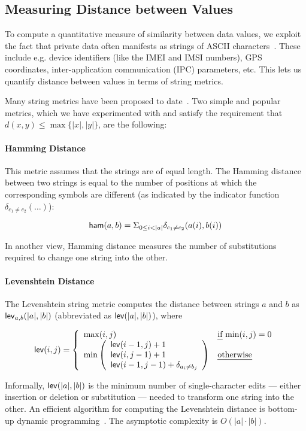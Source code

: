 \subsection{Measuring Distance between Values}\label{Se:similarstr}

To compute a quantitative measure of similarity between data values, we exploit the fact that private data often manifests as strings of ASCII characters~\cite{EGCCJMS:OSDI10,HHJSW:CCS11,YYZGNW:CCS13}. These include e.g. device identifiers (like the IMEI and IMSI numbers), GPS coordinates, inter-application communication (IPC) parameters, etc. This lets us quantify distance between values in terms of string metrics. 

Many string metrics have been proposed to date~\cite{PS:BIS07}. Two simple and popular metrics, which we have experimented with and satisfy the requirement that 
$d(x,y) \leq \max \{ |x|,|y| \}$, are the following:

\paragraph{Hamming Distance} This metric assumes that the strings are of equal length. The Hamming distance between two strings is equal to the number of positions at which the corresponding symbols are different (as indicated by the indicator function $\delta_{c_1 \neq c_2}(\ldots)$):
\begin{small}
$$
{\sf ham}(a,b) = \Sigma_{0 \leq i < |a|} \delta_{c_1 \neq c_2}(a(i),b(i))
$$
\end{small}
In another view, Hamming distance measures the number of substitutions required to change one string into the other.

\paragraph{Levenshtein Distance} The Levenshtein string metric computes the distance between strings $a$ and $b$ as ${\sf lev}_{a,b}(|a|,|b|)$ 
(abbreviated as ${\sf lev}(|a|,|b|)$), where 
\begin{small}
$$ 
{\sf lev}(i,j) = \left\{ 
  \begin{array}{l l}
   \max(i,j)				& \text{\emph{if} $\min(i,j)=0$} \\ 
   \min \left( {\begin{array}{l}
   		{\sf lev}(i-1,j) + 1 \\
		{\sf lev}(i,j-1) + 1 \\
		{\sf lev}(i-1,j-1) + \delta_{a_i \neq b_j} \\
   	   \end{array}} \right) & \text{\emph{otherwise}} \\
   \end{array} \right.
$$
\end{small}
Informally, ${\sf lev}(|a|,|b|)$ is the minimum number of single-character edits --- either insertion or deletion or substitution --- needed to transform one string into the other. An efficient algorithm for computing the Levenshtein distance is bottom-up dynamic programming~\cite{WF:JACM74}. The asymptotic complexity is $O(|a| \cdot |b|)$.

